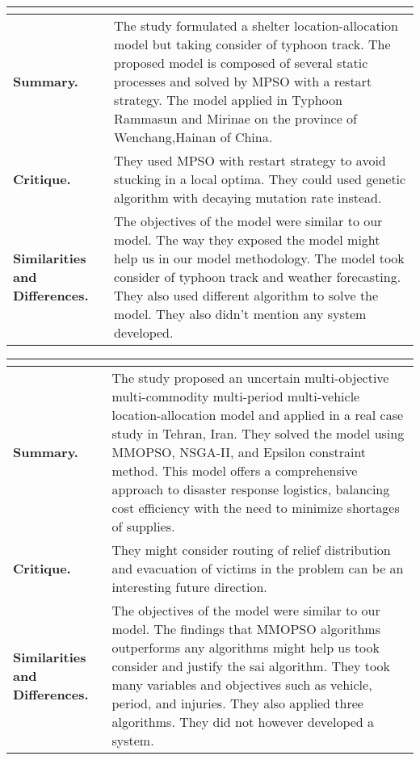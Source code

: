 \begin{longtable}{|L{.2\linewidth}|L{.74\linewidth}|}
	\hline
	\\ \hline
	\textbf{Summary.} & The study formulated a shelter location-allocation model but taking consider of typhoon track. The proposed model is composed of several static processes and solved by MPSO with a restart strategy. The model applied in Typhoon Rammasun and Mirinae on the province of Wenchang,Hainan of China.\\ \hline
	\textbf{Critique.} & They used MPSO with restart strategy to avoid stucking in a local optima. They could used genetic algorithm with decaying mutation rate instead.\\ \hline
	\textbf{Similarities and Differences.} & The objectives of the model were similar to our model. The way they exposed the model might help us in our model methodology.	The model took consider of typhoon track and weather forecasting. They also used different algorithm to solve the model. They also didn't mention any system developed.\\ \hline
\end{longtable}

\begin{longtable}{|L{.2\linewidth}|L{.74\linewidth}|}
	\hline
	\\ \hline
	\textbf{Summary.} & The study proposed an uncertain multi-objective multi-commodity multi-period multi-vehicle location-allocation model and applied in a real case study in Tehran, Iran.  They solved the model using MMOPSO, NSGA-II, and Epsilon constraint method. This model offers a comprehensive approach to disaster response logistics, balancing cost efficiency with the need to minimize shortages of supplies.\\ \hline
	\textbf{Critique.} & They might consider routing of relief distribution and evacuation of victims in the problem can be an interesting future direction.\\ \hline
	\textbf{Similarities and Differences.} & The objectives of the model were similar to our model. The findings that MMOPSO algorithms outperforms any algorithms might help us took consider and justify the sai algorithm.	They took many variables and objectives such as vehicle, period, and injuries. They also applied three algorithms. They did not however developed a system.\\ \hline
\end{longtable}

